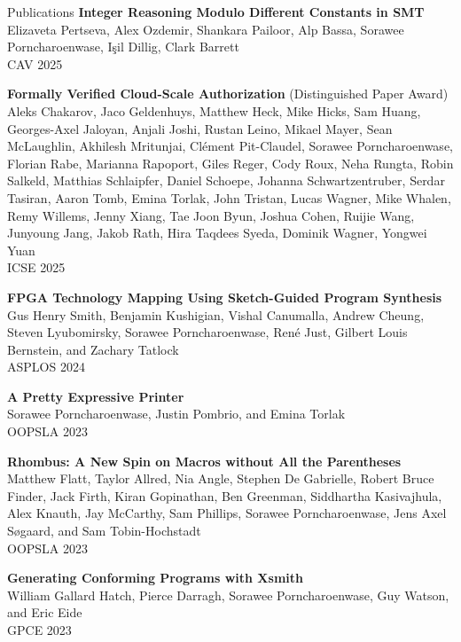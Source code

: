 \documentclass{resume} %
\begin{document}
\begin{rSection}{Publications}
  {\bf Integer Reasoning Modulo Different Constants
  in SMT}\\
  Elizaveta Pertseva,
  Alex Ozdemir,
  Shankara Pailoor,
  Alp Bassa,
  Sorawee Porncharoenwase,
  Işil Dillig,
  Clark Barrett\\
  CAV 2025

  {\bf Formally Verified Cloud-Scale Authorization} (Distinguished Paper Award)\\
  Aleks Chakarov, 
  Jaco Geldenhuys, 
  Matthew Heck, 
  Mike Hicks, 
  Sam Huang, 
  Georges-Axel Jaloyan, 
  Anjali Joshi, 
  Rustan Leino, 
  Mikael Mayer, 
  Sean McLaughlin, 
  Akhilesh Mritunjai, 
  Clément Pit-Claudel, 
  Sorawee Porncharoenwase, 
  Florian Rabe, 
  Marianna Rapoport, 
  Giles Reger, 
  Cody Roux, 
  Neha Rungta, 
  Robin Salkeld, 
  Matthias Schlaipfer, 
  Daniel Schoepe, 
  Johanna Schwartzentruber, 
  Serdar Tasiran, 
  Aaron Tomb, 
  Emina Torlak, 
  John Tristan, 
  Lucas Wagner, 
  Mike Whalen, 
  Remy Willems, 
  Jenny Xiang, 
  Tae Joon Byun, 
  Joshua Cohen, 
  Ruijie Wang, 
  Junyoung Jang, 
  Jakob Rath, 
  Hira Taqdees Syeda, 
  Dominik Wagner, 
  Yongwei Yuan\\
  ICSE 2025

  {\bf FPGA Technology Mapping Using Sketch-Guided Program Synthesis}\\
  Gus Henry Smith,
  Benjamin Kushigian,
  Vishal Canumalla,
  Andrew Cheung,
  Steven Lyubomirsky,
  Sorawee Porncharoenwase,
  René Just,
  Gilbert Louis Bernstein,
  and Zachary Tatlock\\
  ASPLOS 2024

  {\bf A Pretty Expressive Printer}\\
  Sorawee Porncharoenwase, Justin Pombrio, and Emina Torlak\\
  OOPSLA 2023

  {\bf Rhombus: A New Spin on Macros without All the Parentheses}\\
  Matthew Flatt,
  Taylor Allred,
  Nia Angle,
  Stephen De Gabrielle,
  Robert Bruce Finder,
  Jack Firth,
  Kiran Gopinathan,
  Ben Greenman,
  Siddhartha Kasivajhula,
  Alex Knauth,
  Jay McCarthy,
  Sam Phillips,
  Sorawee Porncharoenwase,
  Jens Axel Søgaard,
  and Sam Tobin-Hochstadt\\
  OOPSLA 2023

  {\bf Generating Conforming Programs with Xsmith}\\
  William Gallard Hatch, Pierce Darragh, Sorawee Porncharoenwase, Guy Watson, and Eric Eide\\
  GPCE 2023


\end{rSection}
\end{document}
